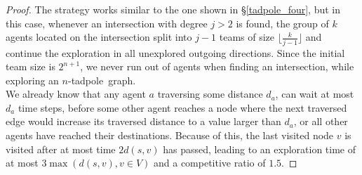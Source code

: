 \begin{proof} The strategy works similar to the one shown in \S\ref{tadpole_four}, but in this case, whenever an intersection with degree $j>2$ is found, the group of $k$ agents located on the intersection
    split into $j-1$ teams of size $\lfloor\frac{k}{j-1}\rfloor$ and continue the exploration in all unexplored outgoing directions. Since the initial team size
    is $2^{n+1}$, we never run out of agents when finding an intersection, while exploring an $n$-tadpole~graph.\\
We already know that any agent $a$ traversing some distance $d_a$, can wait at most $d_a$ time steps, before some other
agent reaches a node where the next traversed edge would increase its traversed distance to a value larger than $d_a$, or 
all other agents have reached their destinations. Because of this, the last visited node $v$ is visited after at most time $2d(s,v)$ has passed, 
leading to an exploration time of at most $3\max(d(s,v), v\in V)$ and a competitive ratio of $1.5$.
\end{proof}
